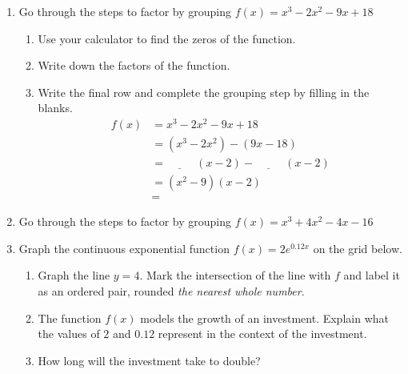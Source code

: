 \documentclass[12pt, twoside]{article}
\begin{document}
\begin{enumerate}[itemsep=0.5cm]
\newpage 
\item Go through the steps to factor by grouping $f(x) = x^3-2x^2-9x+18$
\begin{enumerate}[itemsep=1cm]
    \item Use your calculator to find the zeros of the function.
    \item Write down the factors of the function.
    \item Write the final row and complete the grouping step by filling in the blanks.
    \begin{align*}
        f(x) &= x^3-2x^2-9x+18 \\[0.5cm]
             &= (x^3-2x^2)-(9x-18) \\[0.5cm]
             &= \underline{\hspace{1cm}}\;(x-2) - \underline{\hspace{1cm}}\;(x-2) \\[0.5cm]
             &= (x^2-9)(x-2) \\[0.5cm]
             &=
        \end{align*}
\end{enumerate}

\item Go through the steps to factor by grouping $f(x) = x^3+4x^2-4x-16$

\newpage
\item Graph the continuous exponential function $f(x) = 2e^{0.12x}$ on the grid below. 
\begin{center}
    \end{center}
    \begin{enumerate}
        \item Graph the line $y=4$. Mark the intersection of the line with $f$ and label it as an ordered pair, rounded \emph{the nearest whole number}.
        \item The function $f(x)$ models the growth of an investment. Explain what the values of $2$ and $0.12$ represent in the context of the investment. \vspace{4cm}
        \item How long will the investment take to double? 
    \end{enumerate}

\end{enumerate}
\end{document}
